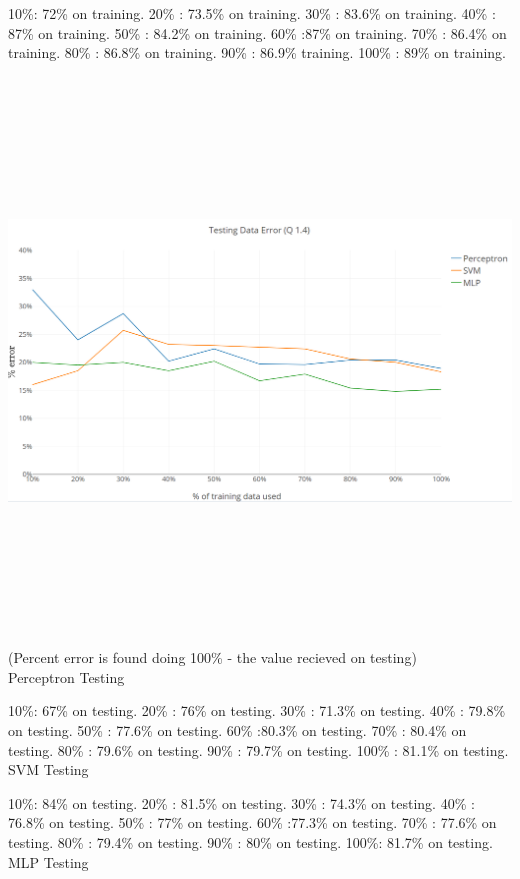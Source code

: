\documentclass{article}
\begin{document}
10\%: 72\%  on training.
20\% : 73.5\% on training.
30\% : 83.6\% on training.
40\% : 87\% on training.
50\% : 84.2\% on training.
60\% :87\% on training.
70\% : 86.4\% on training.
80\% : 86.8\% on training.
90\% : 86.9\% training.
100\% : 89\% on training.

\includegraphics[width=15cm,height=15cm,keepaspectratio]{"Question1AI4"}
(Percent error is found doing 100\% - the value recieved on testing)
\\
{\LARGE Perceptron Testing}

10\%: 67\%  on testing.
20\% : 76\% on testing.
30\% : 71.3\% on testing.
40\% : 79.8\% on testing.
50\% : 77.6\% on testing.
60\% :80.3\% on testing.
70\% : 80.4\% on testing.
80\% : 79.6\% on testing.
90\% : 79.7\% on testing.
100\% : 81.1\% on testing.
\\
{\LARGE SVM Testing}

10\%: 84\%  on testing.
20\% : 81.5\% on testing.
30\% : 74.3\% on testing.
40\% : 76.8\% on testing.
50\% : 77\% on testing.
60\% :77.3\% on testing.
70\% : 77.6\% on testing.
80\% : 79.4\% on testing.
90\% : 80\% on testing.
100\%: 81.7\% on testing.
\\
{\LARGE MLP Testing}
\end{document}
